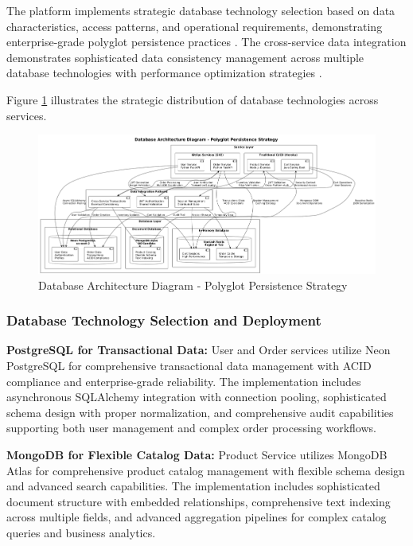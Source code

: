 The platform implements strategic database technology selection based on data characteristics, access patterns, and operational requirements, demonstrating enterprise-grade polyglot persistence practices \cite{polyglot2022}. The cross-service data integration demonstrates sophisticated data consistency management \cite{dataconsistency2023} across multiple database technologies with performance optimization strategies \cite{optimization2022}.


Figure \ref{fig:database-architecture-diagram} illustrates the strategic distribution of database technologies across services.

\begin{figure}[H]
\centering
\includegraphics[width=1.0\textwidth]{figures/Database-Architecture-Diagram.png}
\caption{Database Architecture Diagram - Polyglot Persistence Strategy}
\label{fig:database-architecture-diagram}
\end{figure}


\subsubsection{Database Technology Selection and Deployment}



\textbf{PostgreSQL for Transactional Data:}
User and Order services utilize Neon PostgreSQL for comprehensive transactional data management with ACID compliance and enterprise-grade reliability. The implementation includes asynchronous SQLAlchemy integration with connection pooling, sophisticated schema design with proper normalization, and comprehensive audit capabilities supporting both user management and complex order processing workflows.

\textbf{MongoDB for Flexible Catalog Data:}
Product Service utilizes MongoDB Atlas for comprehensive product catalog management with flexible schema design and advanced search capabilities. The implementation includes sophisticated document structure with embedded relationships, comprehensive text indexing across multiple fields, and advanced aggregation pipelines for complex catalog queries and business analytics.


